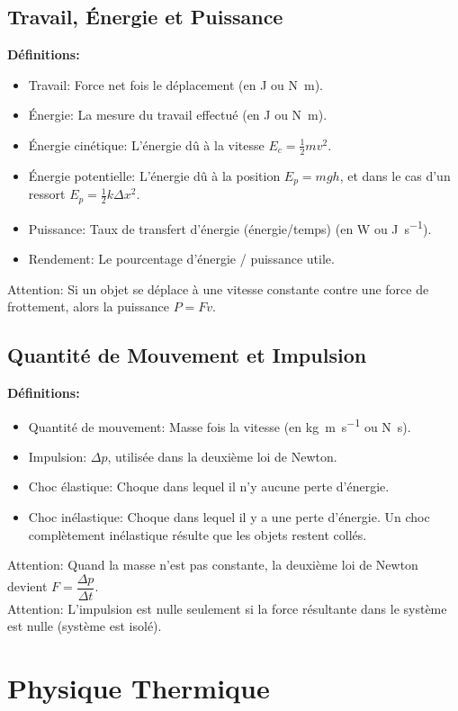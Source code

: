 \documentclass[french, a4paper, 12pt]{article}
\begin{document}
\subsection{Travail, Énergie et Puissance}
\textbf{Définitions:}
\begin{itemize}
\item Travail: Force net fois le déplacement (en \si{\joule} ou \si{\newton\metre}).
\item Énergie: La mesure du travail effectué (en \si{\joule} ou \si{\newton\metre}).
\item Énergie cinétique: L'énergie dû à la vitesse $E_c=\frac{1}{2}mv^2$.
\item Énergie potentielle: L'énergie dû à la position $E_p=mgh$, et dans le cas d'un ressort $E_p=\frac{1}{2}k\Delta x^2$.
\item Puissance: Taux de transfert d'énergie (énergie/temps) (en \si{\watt} ou \si{\joule\per\second}).
\item Rendement: Le pourcentage d'énergie / puissance utile.
\end{itemize}
Attention: Si un objet se déplace à une vitesse constante contre une force de frottement, alors la puissance $P=Fv$.

\subsection{Quantité de Mouvement et Impulsion}
\textbf{Définitions:}
\begin{itemize}
\item Quantité de mouvement: Masse fois la vitesse (en \si{\kilogram\metre\per\second} ou \si{\newton\second}).
\item Impulsion: $\Delta p$, utilisée dans la deuxième loi de Newton.
\item Choc élastique: Choque dans lequel il n'y aucune perte d'énergie.
\item Choc inélastique: Choque dans lequel il y a une perte d'énergie. Un choc complètement inélastique résulte que les objets restent collés.
\end{itemize}
Attention: Quand la masse n'est pas constante, la deuxième loi de Newton devient $F=\dfrac{\Delta p}{\Delta t}$.\\
Attention: L'impulsion est nulle seulement si la force résultante dans le système est nulle (système est isolé).

\section{Physique Thermique}
\end{document}
